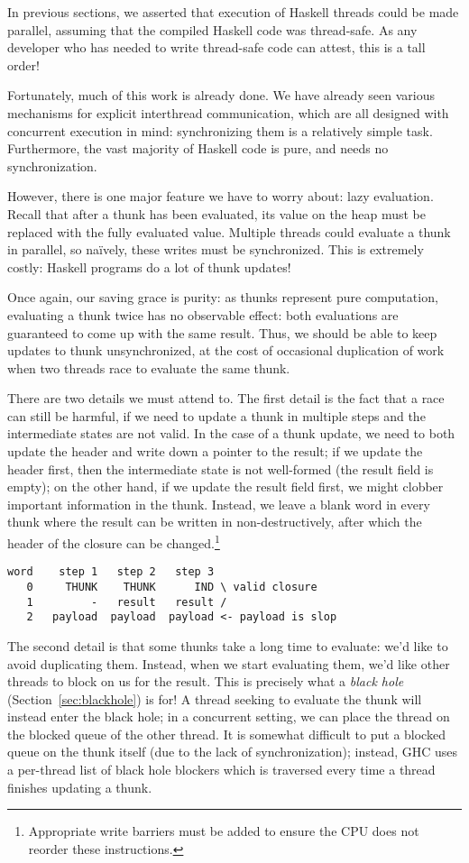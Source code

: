 In previous sections, we asserted that execution of Haskell threads
could be made parallel, assuming that the compiled Haskell code was
thread-safe.  As any developer who has needed to write thread-safe code
can attest, this is a tall order!

Fortunately, much of this work is already done.  We have already seen various mechanisms
for explicit interthread communication, which are all designed with
concurrent execution in mind:  synchronizing them is a relatively simple
task.  Furthermore, the vast majority of Haskell code is pure, and needs no
synchronization.

However, there is one major feature we have to worry about: lazy
evaluation.  Recall that after a thunk has been evaluated, its value on
the heap must be replaced with the fully evaluated value. Multiple
threads could evaluate a thunk in parallel, so na\"ively, these writes
must be synchronized.  This is extremely costly: Haskell programs do a
lot of thunk updates!

Once again, our saving grace is purity: as thunks represent pure
computation, evaluating a thunk twice has no observable effect: both
evaluations are guaranteed to come up with the same result.  Thus, we
should be able to keep updates to thunk unsynchronized, at the cost of
occasional duplication of work when two threads race to evaluate the
same thunk.

There are two details we must attend to.  The first detail is the fact
that a race can still be harmful, if we need to update a thunk in
multiple steps and the intermediate states are not valid.  In the case
of a thunk update, we need to both update the header and write down a
pointer to the result; if we update the header first, then the
intermediate state is not well-formed (the result field is empty); on
the other hand, if we update the result field first, we might clobber
important information in the thunk.  Instead, we leave a blank word in
every thunk where the result can be written in non-destructively, after
which the header of the closure can be changed.\footnote{Appropriate
write barriers must be added to ensure the CPU does not reorder these
instructions.}

\begin{verbatim}
word    step 1   step 2   step 3
   0     THUNK    THUNK      IND \ valid closure
   1         -   result   result /
   2   payload  payload  payload <- payload is slop
\end{verbatim}

The second detail is that some thunks take a long time to evaluate: we'd
like to avoid duplicating them.  Instead, when we start evaluating them,
we'd like other threads to block on us for the result.  This is
precisely what a \emph{black hole} (Section~\ref{sec:blackhole}) is for!
A thread seeking to evaluate the thunk will instead enter the black
hole; in a concurrent setting, we can place the thread on the blocked
queue of the other thread.  It is somewhat difficult to put a blocked
queue on the thunk itself (due to the lack of synchronization); instead,
GHC uses a per-thread list of black hole blockers which is traversed
every time a thread finishes updating a thunk.

